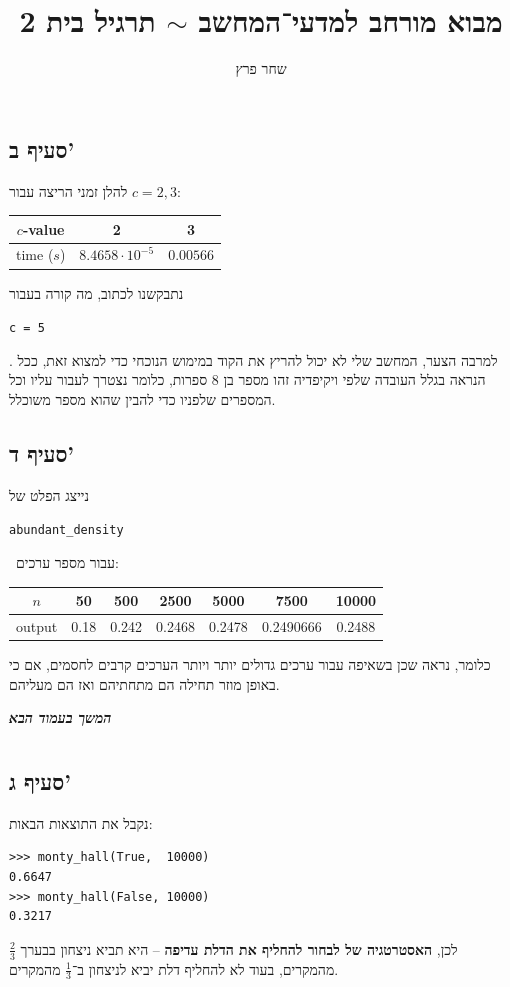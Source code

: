 \documentclass[]{article}
\author{שחר פרץ}
\title{מבוא מורחב למדעי־המחשב $\sim$ תרגיל בית 2}
\newcommand\en[1] {\begin{otherlanguage}{english}#1\end{otherlanguage}}
\newcommand\sen   {\begin{otherlanguage}{english}}
\newcommand\she   {\end{otherlanguage}}
\newcommand\ttt[1]{\en{\footnotesize\texttt{#1}\normalsize}}
\newcommand\npage {\vfil {\hfil \textbf{\textit{המשך בעמוד הבא}}} \hfil \vfil \pagebreak}
\begin{document}
	\maketitle
	\section{} %
	\subsection*{סעיף ב'}
	להלן זמני הריצה עבור $c = 2, 3$: 
	\begin{center}
		\sen\begin{tabular}{|c|c|c|}
			\hline $c$-value & 2 & 3 \\
			\hline time ($s$) & $8.4658\cdot 10^{-5}$ & $0.00566$ \\
			\hline 
		\end{tabular}\she
	\end{center}
	
	נתבקשנו לכתוב, מה קורה בעבור \ttt{c = 5}. למרבה הצער, המחשב שלי לא יכול להריץ את הקוד במימוש הנוכחי כדי למצוא זאת, ככל הנראה בגלל העובדה שלפי ויקיפדיה זהו מספר בן $8$ ספרות, כלומר נצטרך לעבור עליו וכל המספרים שלפניו כדי להבין שהוא מספר משוכלל. 
	\subsection*{סעיף ד'}
	נייצג הפלט של \ttt{abundant\_density} \ עבור מספר ערכים: 
	
	\begin{center}	
		\sen
		\begin{tabular}{|c|c|c|c|c|c|c|}
			\hline $n$ & 50 & 500 & 2500 & 5000 & 7500 & 10000 \\
			\hline output & 0.18 & 0.242 & 0.2468 & 0.2478 & 0.2490666 & 0.2488 \\
			\hline
		\end{tabular}
		\she
	\end{center}
	כלומר, נראה שכן בשאיפה עבור ערכים גדולים יותר ויותר הערכים קרבים לחסמים, אם כי באופן מוזר תחילה הם מתחתיהם ואז הם מעליהם. 
	
	\npage
	
	\section{} %
	\subsection*{סעיף ג'}
	נקבל את התוצאות הבאות: 
	\sen\begin{lstlisting}
>>> monty_hall(True,  10000)
0.6647
>>> monty_hall(False, 10000)
0.3217\end{lstlisting}\she
	לכן, \textbf{האסטרטגיה של לבחור להחליף את הדלת עדיפה} – היא תביא ניצחון בבערך $\frac{2}{3}$ מהמקרים, בעוד לא להחליף דלת יביא לניצחון ב־$\frac{1}{3}$ מהמקרים. 
\end{document}
